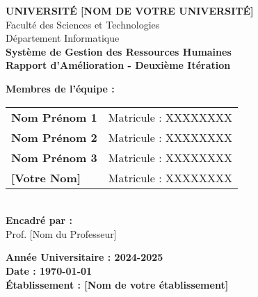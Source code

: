 \documentclass[12pt,a4paper]{article}
\begin{document}
\begin{titlepage}
    \centering
    \vspace*{2cm}
    
    {\Large \textbf{UNIVERSITÉ [NOM DE VOTRE UNIVERSITÉ]}}\\[0.5cm]
    {\large Faculté des Sciences et Technologies}\\[0.5cm]
    {\large Département Informatique}\\[2cm]
    
    {\Huge \textbf{Système de Gestion des Ressources Humaines}}\\[1cm]
    {\Large \textbf{Rapport d'Amélioration - Deuxième Itération}}\\[2cm]
    
    \begin{minipage}{0.8\textwidth}
        \centering
        {\large \textbf{Membres de l'équipe :}}\\[0.5cm]
        \begin{tabular}{ll}
            \textbf{Nom Prénom 1} & Matricule : XXXXXXXX \\
            \textbf{Nom Prénom 2} & Matricule : XXXXXXXX \\
            \textbf{Nom Prénom 3} & Matricule : XXXXXXXX \\
            \textbf{[Votre Nom]} & Matricule : XXXXXXXX \\
        \end{tabular}
    \end{minipage}\\[2cm]
    
    {\large \textbf{Encadré par :}}\\[0.5cm]
    {\large Prof. [Nom du Professeur]}\\[2cm]
    
    \vfill
    
    {\large \textbf{Année Universitaire : 2024-2025}}\\[0.5cm]
    {\large \textbf{Date : \today}}\\[0.5cm]
    {\large \textbf{Établissement : [Nom de votre établissement]}}
    
\end{titlepage}

\newpage
\thispagestyle{empty}
\mbox{}

\newpage
{}
\setcounter{page}{1}
\tableofcontents

\newpage
\thispagestyle{empty}
\mbox{}
\end{document}
